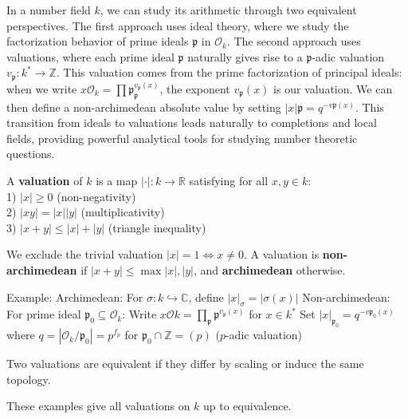 \begin{outline}
\0 \begin{note}
    In a number field $k$, we can study its arithmetic through two equivalent perspectives. The first approach uses ideal theory, where we study the factorization behavior of prime ideals $\mathfrak{p}$ in $\mathcal{O}_k$. The second approach uses valuations, where each prime ideal $\mathfrak{p}$ naturally gives rise to a $\mathfrak{p}$-adic valuation $v_\mathfrak{p}: k^* \to \mathbb{Z}$. This valuation comes from the prime factorization of principal ideals: when we write $x\mathcal{O}_k = \prod{\mathfrak{p}}_\mathfrak{p}^{v_\mathfrak{p}(x)}$, the exponent $v_\mathfrak{p}(x)$ is our valuation. We can then define a non-archimedean absolute value by setting $|x|\mathfrak{p} = q^{-v\mathfrak{p}(x)}$. This transition from ideals to valuations leads naturally to completions and local fields, providing powerful analytical tools for studying number theoretic questions.
\end{note}

\0 \begin{definition}
A \textbf{valuation} of $k$ is a map $|\cdot| : k \to \mathbb{R}$ satisfying for all $x,y \in k$:\\
1) $|x| \geq 0$ (non-negativity) \\
2) $|xy| = |x||y|$ (multiplicativity) \\
3) $|x+y| \leq |x| + |y|$ (triangle inequality) 
\end{definition}

\1 We exclude the trivial valuation $|x|=1 \iff x\neq 0$.
\1 A valuation is \textbf{non-archimedean} if $|x+y| \leq \max{|x|,|y|}$, and \textbf{archimedean} otherwise.

\1 Example: 
    \2 Archimedean: For $\sigma: k \hookrightarrow \mathbb{C}$, define $|x|_\sigma = |\sigma(x)|$
    \2 Non-archimedean: For prime ideal $\mathfrak{p}_0 \subseteq \mathcal{O}_k$:
        \3 Write $x\mathcal{O}k = \prod_{\mathfrak{p}}\mathfrak{p}^{v_\mathfrak{p}(x)}$ for $x \in k^*$
        \3 Set $|x|_{\mathfrak{p}_0} = q^{-v{\mathfrak{p}_0}(x)}$ where $q = |\mathcal{O}_k/\mathfrak{p}_0| = p^{f_p}$ for $\mathfrak{p}_0 \cap \mathbb{Z} = (p)$ ($p$-adic valuation)

\0 \begin{definition}
    Two valuations are equivalent if they differ by scaling or induce the same topology.
\end{definition}

\0 \begin{theorem}[Ostrowski]
These examples give all valuations on $k$ up to equivalence.
\end{theorem}
\end{outline}

